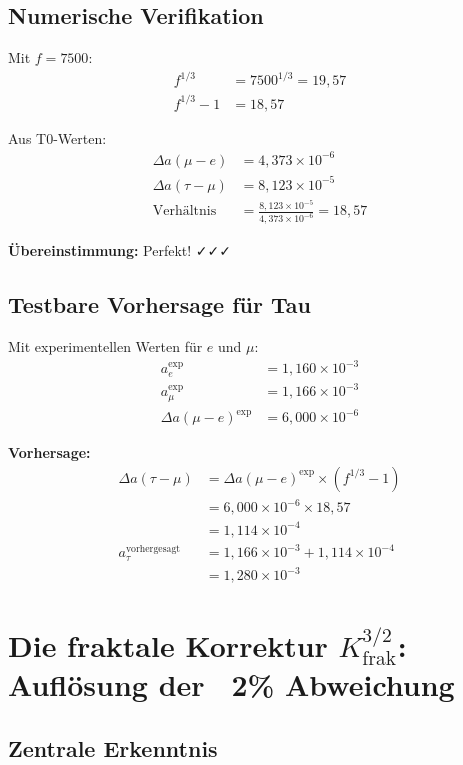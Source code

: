	\subsection{Numerische Verifikation}
	
	Mit $f = 7500$:
	\begin{align}
		f^{1/3} &= 7500^{1/3} = 19{,}57 \\
		f^{1/3} - 1 &= 18{,}57
	\end{align}
	
	Aus T0-Werten:
	\begin{align}
		\Delta a(\mu - e) &= 4{,}373 \times 10^{-6} \\
		\Delta a(\tau - \mu) &= 8{,}123 \times 10^{-5} \\
		\text{Verhältnis} &= \frac{8{,}123 \times 10^{-5}}{4{,}373 \times 10^{-6}} = 18{,}57
	\end{align}
	
	\textbf{Übereinstimmung:} Perfekt! ✓✓✓
	
	\subsection{Testbare Vorhersage für Tau}
	
	Mit experimentellen Werten für $e$ und $\mu$:
	\begin{align}
		a_e^{\text{exp}} &= 1{,}160 \times 10^{-3} \\
		a_\mu^{\text{exp}} &= 1{,}166 \times 10^{-3} \\
		\Delta a(\mu - e)^{\text{exp}} &= 6{,}000 \times 10^{-6}
	\end{align}
	
	\textbf{Vorhersage:}
	\begin{align}
		\Delta a(\tau - \mu) &= \Delta a(\mu - e)^{\text{exp}} \times (f^{1/3} - 1) \\
		&= 6{,}000 \times 10^{-6} \times 18{,}57 \\
		&= 1{,}114 \times 10^{-4} \\
		a_\tau^{\text{vorhergesagt}} &= 1{,}166 \times 10^{-3} + 1{,}114 \times 10^{-4} \\
		&= 1{,}280 \times 10^{-3}
	\end{align}
	
	\section{Die fraktale Korrektur $K_\text{frak}^{3/2}$: Auflösung der ~2\% Abweichung}
	
	\subsection{Zentrale Erkenntnis}
	
